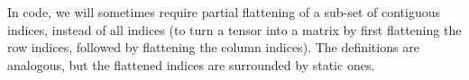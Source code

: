 In code, we will sometimes require partial flattening of a sub-set of contiguous indices, instead of all indices (\eg to turn a tensor into a matrix by first flattening the row indices, followed by flattening the column indices).
The definitions are analogous, but the flattened indices are surrounded by static ones.
